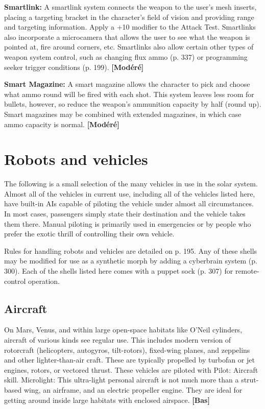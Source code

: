 {{\textbf{Smartlink:} A smartlink system connects the weapon to the user’s mesh inserts, placing a targeting bracket in the character’s field of vision and providing range and targeting information. Apply a +10 modifier to the Attack Test. Smartlinks also incorporate a microcamera that allows the user to see what the weapon is pointed at, fire around corners, etc. Smartlinks also allow certain other types of weapon system control, such as changing flux ammo (p. 337) or programming seeker trigger conditions (p. 199). \textbf{[Modéré]} 

\textbf{Smart Magazine:} A smart magazine allows the character to pick and choose what ammo round will be fired with each shot. This system leaves less room for bullets, however, so reduce the weapon’s ammunition capacity by half (round up). Smart magazines may be combined with extended magazines, in which case ammo capacity is normal. \textbf{[Modéré]} 

\section{Robots and vehicles} \label{sec:robots-vehicles} 

The following is a small selection of the many vehicles in use in the solar system. Almost all of the vehicles in current use, including all of the vehicles listed here, have built-in AIs capable of piloting the vehicle under almost all circumstances. In most cases, passengers simply state their destination and the vehicle takes them there. Manual piloting is primarily used in emergencies or by people who prefer the exotic thrill of controlling their own vehicle. 

Rules for handling robots and vehicles are detailed on p. 195. Any of these shells may be modified for use as a synthetic morph by adding a cyberbrain system (p. 300). Each of the shells listed here comes with a puppet sock (p. 307) for remote-control operation. 

\subsection{Aircraft} \label{sec:aircraft} 

On Mars, Venus, and within large open-space habitats like O’Neil cylinders, aircraft of various kinds see regular use. This includes modern version of rotorcraft (helicopters, autogyros, tilt-rotors), fixed-wing planes, and zeppelins and other lighter-than-air craft. These are typically propelled by turbofan or jet engines, rotors, or vectored thrust. These vehicles are piloted with Pilot: Aircraft skill. Microlight: This ultra-light personal aircraft is not much more than a strut-based wing, an airframe, and an electric propeller engine. They are ideal for getting around inside large habitats with enclosed airspace. \textbf{[Bas]} 

}}
